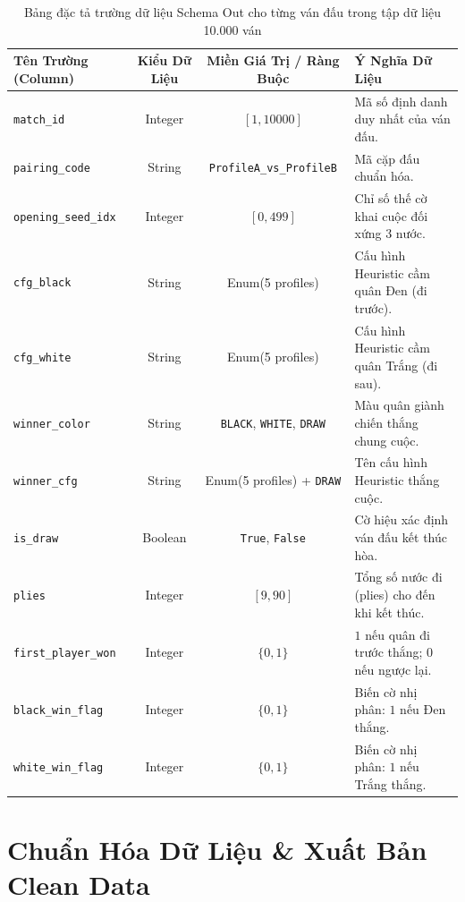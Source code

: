 \documentclass[11pt,a4paper]{article}
\begin{document}
\begin{table}[htbp]
\centering
\small
\caption{Bảng đặc tả trường dữ liệu Schema Out cho từng ván đấu trong tập dữ liệu 10.000 ván}
\label{tab:schema_out}
\begin{tabularx}{\textwidth}{l c c X}
\toprule
\textbf{Tên Trường (Column)} & \textbf{Kiểu Dữ Liệu} & \textbf{Miền Giá Trị / Ràng Buộc} & \textbf{Ý Nghĩa Dữ Liệu} \\
\midrule
\texttt{match\_id}         & Integer & $[1, 10000]$ & Mã số định danh duy nhất của ván đấu. \\
\texttt{pairing\_code}     & String  & \texttt{ProfileA\_vs\_ProfileB} & Mã cặp đấu chuẩn hóa. \\
\texttt{opening\_seed\_idx}& Integer & $[0, 499]$ & Chỉ số thế cờ khai cuộc đối xứng 3 nước. \\
\texttt{cfg\_black}        & String  & Enum(5 profiles) & Cấu hình Heuristic cầm quân Đen (đi trước). \\
\texttt{cfg\_white}        & String  & Enum(5 profiles) & Cấu hình Heuristic cầm quân Trắng (đi sau). \\
\texttt{winner\_color}     & String  & \texttt{BLACK}, \texttt{WHITE}, \texttt{DRAW} & Màu quân giành chiến thắng chung cuộc. \\
\texttt{winner\_cfg}       & String  & Enum(5 profiles) + \texttt{DRAW} & Tên cấu hình Heuristic thắng cuộc. \\
\texttt{is\_draw}          & Boolean & \texttt{True}, \texttt{False} & Cờ hiệu xác định ván đấu kết thúc hòa. \\
\texttt{plies}             & Integer & $[9, 90]$ & Tổng số nước đi (plies) cho đến khi kết thúc. \\
\texttt{first\_player\_won}& Integer & $\{0, 1\}$ & $1$ nếu quân đi trước thắng; $0$ nếu ngược lại. \\
\texttt{black\_win\_flag}  & Integer & $\{0, 1\}$ & Biến cờ nhị phân: $1$ nếu Đen thắng. \\
\texttt{white\_win\_flag}  & Integer & $\{0, 1\}$ & Biến cờ nhị phân: $1$ nếu Trắng thắng. \\
\bottomrule
\end{tabularx}
\end{table}

\section{Chuẩn Hóa Dữ Liệu \& Xuất Bản Clean Data}
\end{document}
